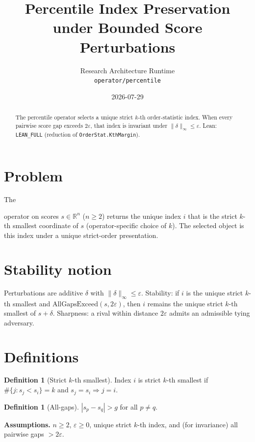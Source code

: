 \documentclass[12pt]{article}
\title{Percentile Index Preservation under Bounded Score Perturbations}
\author{Research Architecture Runtime\\[0.25em]
{\normalsize\texttt{operator/percentile}}}
\date{2026-07-29}
\theoremstyle{plain}
\theoremstyle{definition}
\newtheorem{definition}[theorem]{Definition}
\theoremstyle{remark}
\newcommand{\leanpath}[1]{%
  {\raggedright\urlstyle{tt}\path{#1}}}
\begin{document}
\maketitle

\begin{abstract}
The percentile operator selects a unique strict $k$-th order-statistic index. When every pairwise score gap exceeds $2\varepsilon$, that index is invariant under $\|\delta\|_\infty\le\varepsilon$. Lean: \texttt{LEAN\_FULL} (reduction of \texttt{OrderStat.KthMargin}).
\end{abstract}

\noindent
\begin{center}
\end{center}
\vspace{0.6em}

\section{Problem}
{\raggedright\sloppy
The \leanpath{percentile} operator on scores $s\in\mathbb{R}^n$ ($n\ge 2$) returns the unique index $i$ that is the strict $k$-th smallest coordinate of $s$ (operator-specific choice of $k$). The selected object is this index under a unique strict-order presentation.
\par}

\section{Stability notion}
Perturbations are additive $\delta$ with $\|\delta\|_\infty\le\varepsilon$. Stability: if $i$ is the unique strict $k$-th smallest and $\mathrm{AllGapsExceed}(s,2\varepsilon)$, then $i$ remains the unique strict $k$-th smallest of $s+\delta$. Sharpness: a rival within distance $2\varepsilon$ admits an admissible tying adversary.

\section{Definitions}
\begin{definition}[Strict $k$-th smallest]
Index $i$ is strict $k$-th smallest if $\#\{j:s_j<s_i\}=k$ and $s_j=s_i\Rightarrow j=i$.
\end{definition}
\begin{definition}[All-gaps]
$|s_p-s_q|>g$ for all $p\neq q$.
\end{definition}
\noindent\textbf{Assumptions.} $n\ge 2$, $\varepsilon\ge 0$, unique strict $k$-th index, and (for invariance) all pairwise gaps $>2\varepsilon$.
\end{document}

